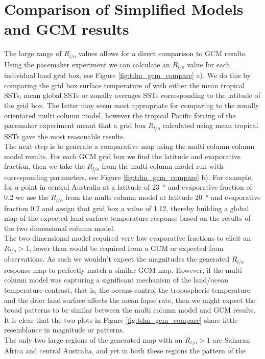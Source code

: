 \section{Comparison of Simplified Models and GCM results}
\label{zonmercol}
The large range of $R_{l/o}$ values allows for a direct comparison to GCM 
results. Using the pacemaker experiment we can calculate an $R_{l/o}$ value for 
each individual land grid box, see Figure \ref{fig:tdm_gcm_compare} a). We do 
this by comparing the grid box surface temperature of with either the mean 
tropical SSTs, mean global SSTs or zonally averages SSTs corresponding to the 
latitude of the grid box. The latter may seem most appropriate for comparing to 
the zonally orientated multi column model, however the tropical Pacific forcing 
of the pacemaker experiment meant that a grid box $R_{l/o}$ calculated using 
mean tropical SSTs gave the most reasonable results.\\
The next step is to generate a comparative map using the multi column column model 
results. For each GCM grid box we find the latitude and evaporative fraction, 
then we take the $R_{l/o}$ from the multi column model run with corresponding parameters, 
see Figure \ref{fig:tdm_gcm_compare} b).  For example, for a point in central 
Australia at a latitude of \SI{23}{\degree} and evaporative fraction of 0.2 we 
use the $R_{l/o}$ from the multi column model at latitude \SI{20}{\degree} and evaporative 
fraction 0.2 and assign that grid box a value of 1.12, thereby building a global 
map of the expected land surface temperature response based on the results of 
the two dimensional column model.\\
The two-dimensional model required very low evaporative fractions to elicit an 
$R_{l/o}>1$, lower than would be required from a GCM or expected from 
observations. As such we wouldn't expect the magnitudes the generated $R_{l/o}$ 
response map to perfectly match a similar GCM map. However, if the multi column model was 
capturing a significant mechanism of the land/ocean temperature contrast, that 
is, the oceans control the tropospheric temperature and the drier land surface 
affects the mean lapse rate, then we might expect the broad patterns to be 
similar between the multi column model and GCM results. It is clear that the two plots in 
Figure \ref{fig:tdm_gcm_compare} share little resemblance in magnitude or 
patterns.\\
The only two large regions of the generated map with an $R_{l/o}>1$ are Saharan 
Africa and central Australia, and yet in both these regions the pattern of the 
